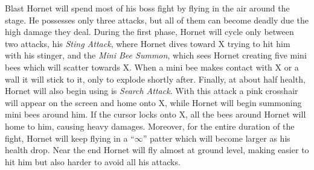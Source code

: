 Blast Hornet will spend most of his boss fight by flying in the air around the stage. He possesses only three attacks, but all of them can become deadly due the high damage they deal. During the first phase, Hornet will cycle only between two attacks, his \emph{Sting Attack}, where Hornet dives toward X trying to hit him with his stinger, and the \emph{Mini Bee Summon}, which sees Hornet creating five mini bees which will scatter towards X. When a mini bee makes contact with X or a wall it will stick to it, only to explode shortly after. Finally, at about half health, Hornet will also begin using is \emph{Search Attack}. With this attack a pink crosshair will appear on the screen and home onto X, while Hornet will begin summoning mini bees around him. If the cursor locks onto X, all the bees around Hornet will home to him, causing heavy damages. Moreover, for the entire duration of the fight, Hornet will keep flying in a ``$\infty$'' patter which will become larger as his health drop. Near the end Hornet will fly almost at ground level, making  easier to hit him but also harder to avoid all his attacks.

